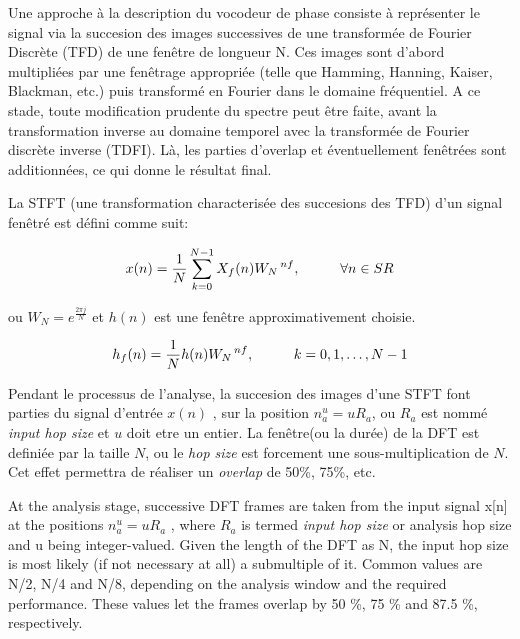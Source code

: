     Une approche à la description du vocodeur de phase consiste à représenter le signal via la succesion des images successives de une transformée de Fourier Discrète (TFD) de une fenêtre de longueur N. Ces images sont d'abord multipliées par une fenêtrage appropriée (telle que Hamming, Hanning, Kaiser, Blackman, etc.) puis transformé en Fourier dans le domaine fréquentiel. A ce stade, toute modification prudente du spectre peut être faite, avant la transformation inverse au domaine temporel avec la transformée de Fourier discrète inverse (TDFI). Là, les parties d'overlap et éventuellement fenêtrées sont additionnées, ce qui donne le résultat final.

\vspace{0.4cm}


La STFT (une transformation characterisée des succesions des TFD) d'un signal fenêtré est défini comme suit:

\begin{equation}
    x(n) = \frac{1}{N}\sum_{ k = 0 }^{ N-1 } X_f (n)W_N \hspace{0.05cm}^{ nf}, \hspace{1cm} \forall n \in SR 
\end{equation}

ou \hspace{0.1cm} $	W_N = e ^ {\frac{2\pi j}{N}} $ \hspace{0.1cm} et $ h(n) $ est une fenêtre approximativement choisie.

\begin{equation}
    h_f(n) = \frac{1}{N} h(n) W_N \hspace{0.05cm} ^{nf},\hspace{1cm}  k = 0, 1, \dots, N - 1 
\end{equation}

Pendant le processus de l'analyse, la succesion des images d'une STFT font parties du signal d'entrée $x(n)$
, sur la position $n_a^u = uR_a$, ou $R_a$ est nommé \textit{input hop size} et $u$ doit etre un entier. La fenêtre(ou la durée) de la DFT est definiée par la taille $N$, ou le \textit{hop size} est forcement une sous-multiplication de $N$. Cet effet permettra de réaliser un \textit{overlap} de 50\%, 75\%, etc.




At the analysis stage, successive DFT frames are taken from the input signal x[n] at the positions $n_a^u = uR_a$ , where $R_a$ is termed \textit{input hop size} or analysis hop size and u being integer-valued. Given the length of the DFT as N, the input hop size is most likely (if not necessary at all) a submultiple of it. Common values are N/2, N/4 and N/8, depending on the analysis window and the required performance. These values let the frames
overlap by 50 \%, 75 \% and 87.5 \%, respectively.


